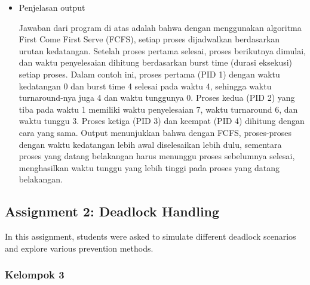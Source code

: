 \documentclass[12pt]{article}
\begin{document}
\begin{itemize}
 \item Penjelasan output

 Jawaban dari program di atas adalah bahwa dengan menggunakan algoritma First Come First Serve (FCFS), setiap proses dijadwalkan berdasarkan urutan kedatangan. Setelah proses pertama selesai, proses berikutnya dimulai, dan waktu penyelesaian dihitung berdasarkan burst time (durasi eksekusi) setiap proses. Dalam contoh ini, proses pertama (PID 1) dengan waktu kedatangan 0 dan burst time 4 selesai pada waktu 4, sehingga waktu turnaround-nya juga 4 dan waktu tunggunya 0. Proses kedua (PID 2) yang tiba pada waktu 1 memiliki waktu penyelesaian 7, waktu turnaround 6, dan waktu tunggu 3. Proses ketiga (PID 3) dan keempat (PID 4) dihitung dengan cara yang sama. Output menunjukkan bahwa dengan FCFS, proses-proses dengan waktu kedatangan lebih awal diselesaikan lebih dulu, sementara proses yang datang belakangan harus menunggu proses sebelumnya selesai, menghasilkan waktu tunggu yang lebih tinggi pada proses yang datang belakangan.
\end{itemize}

\subsection{Assignment 2: Deadlock Handling}
In this assignment, students were asked to simulate different deadlock scenarios and explore various prevention methods.
\subsubsection{Kelompok 3}
\end{document}
